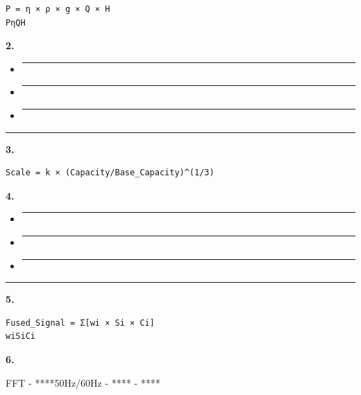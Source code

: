 \begin{verbatim}
P = η × ρ × g × Q × H
PηQH
\end{verbatim}

\textbf{2. }

\begin{itemize}
\item
  \begin{center}\rule{0.5\linewidth}{0.5pt}\end{center}
\item
  \begin{center}\rule{0.5\linewidth}{0.5pt}\end{center}
\item
  \begin{center}\rule{0.5\linewidth}{0.5pt}\end{center}
\end{itemize}

\begin{center}\rule{0.5\linewidth}{0.5pt}\end{center}

\textbf{3. }

\begin{verbatim}
Scale = k × (Capacity/Base_Capacity)^(1/3)
\end{verbatim}

\textbf{4. }

\begin{itemize}
\item
  \begin{center}\rule{0.5\linewidth}{0.5pt}\end{center}
\item
  \begin{center}\rule{0.5\linewidth}{0.5pt}\end{center}
\item
  \begin{center}\rule{0.5\linewidth}{0.5pt}\end{center}
\end{itemize}

\begin{center}\rule{0.5\linewidth}{0.5pt}\end{center}

\textbf{5. }

\begin{verbatim}
Fused_Signal = Σ[wi × Si × Ci]
wiSiCi
\end{verbatim}

\textbf{6. }

FFT - ****50Hz/60Hz - **** - ****

